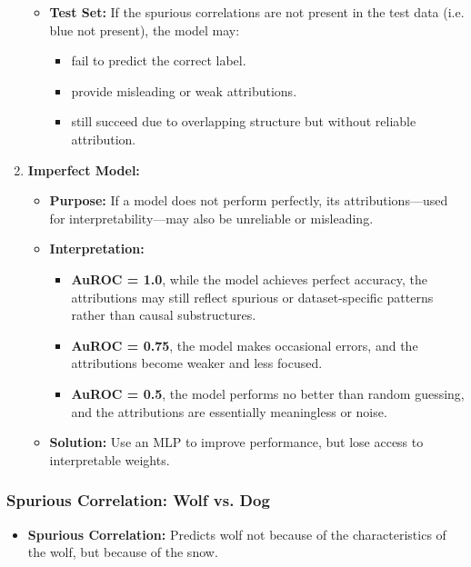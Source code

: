 \begin{example}
\begin{enumerate}
\begin{itemize}
            \item \textbf{Test Set:} If the spurious correlations are not present in the test data (i.e. blue not present), the model may:
            \begin{itemize}
                \item fail to predict the correct label.
                \item provide misleading or weak attributions.
                \item still succeed due to overlapping structure but without reliable attribution.
            \end{itemize}
        \end{itemize}
        \item \textbf{Imperfect Model:}
        \begin{itemize}
            \item \textbf{Purpose:} If a model does not perform perfectly, its attributions—used for interpretability—may also be unreliable or misleading.        
            \item \textbf{Interpretation:}
            \begin{itemize}
                \item \textbf{AuROC = 1.0}, while the model achieves perfect accuracy, the attributions may still reflect spurious or dataset-specific patterns rather than causal substructures.
                \item \textbf{AuROC = 0.75}, the model makes occasional errors, and the attributions become weaker and less focused.
                \item \textbf{AuROC = 0.5}, the model performs no better than random guessing, and the attributions are essentially meaningless or noise.
            \end{itemize}
            \item \textbf{Solution:} Use an MLP to improve performance, but lose access to interpretable weights. 
        \end{itemize}        
    \end{enumerate}
\end{example}
\newpage

\subsubsection{Spurious Correlation: Wolf vs. Dog}
\begin{example}
    \begin{itemize}
        \item \textbf{Spurious Correlation:} Predicts wolf not because of the characteristics of the wolf, but because of the snow.
    \end{itemize}
\end{example}